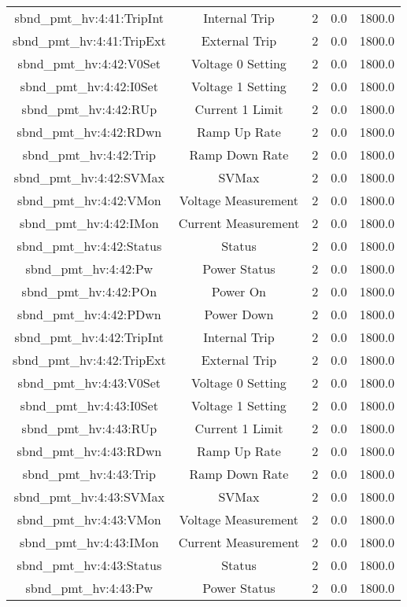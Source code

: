 \begin{center}
\begin{longtable}{c | c c c c }
sbnd\_pmt\_hv:4:41:TripInt & Internal Trip & 2 & 0.0 & 1800.0\\ 
sbnd\_pmt\_hv:4:41:TripExt & External Trip & 2 & 0.0 & 1800.0\\ 
sbnd\_pmt\_hv:4:42:V0Set & Voltage 0 Setting & 2 & 0.0 & 1800.0\\ 
sbnd\_pmt\_hv:4:42:I0Set & Voltage 1 Setting & 2 & 0.0 & 1800.0\\ 
sbnd\_pmt\_hv:4:42:RUp & Current 1 Limit & 2 & 0.0 & 1800.0\\ 
sbnd\_pmt\_hv:4:42:RDwn & Ramp Up Rate & 2 & 0.0 & 1800.0\\ 
sbnd\_pmt\_hv:4:42:Trip & Ramp Down Rate & 2 & 0.0 & 1800.0\\ 
sbnd\_pmt\_hv:4:42:SVMax & SVMax & 2 & 0.0 & 1800.0\\ 
sbnd\_pmt\_hv:4:42:VMon & Voltage Measurement & 2 & 0.0 & 1800.0\\ 
sbnd\_pmt\_hv:4:42:IMon & Current Measurement & 2 & 0.0 & 1800.0\\ 
sbnd\_pmt\_hv:4:42:Status & Status & 2 & 0.0 & 1800.0\\ 
sbnd\_pmt\_hv:4:42:Pw & Power Status & 2 & 0.0 & 1800.0\\ 
sbnd\_pmt\_hv:4:42:POn & Power On & 2 & 0.0 & 1800.0\\ 
sbnd\_pmt\_hv:4:42:PDwn & Power Down & 2 & 0.0 & 1800.0\\ 
sbnd\_pmt\_hv:4:42:TripInt & Internal Trip & 2 & 0.0 & 1800.0\\ 
sbnd\_pmt\_hv:4:42:TripExt & External Trip & 2 & 0.0 & 1800.0\\ 
sbnd\_pmt\_hv:4:43:V0Set & Voltage 0 Setting & 2 & 0.0 & 1800.0\\ 
sbnd\_pmt\_hv:4:43:I0Set & Voltage 1 Setting & 2 & 0.0 & 1800.0\\ 
sbnd\_pmt\_hv:4:43:RUp & Current 1 Limit & 2 & 0.0 & 1800.0\\ 
sbnd\_pmt\_hv:4:43:RDwn & Ramp Up Rate & 2 & 0.0 & 1800.0\\ 
sbnd\_pmt\_hv:4:43:Trip & Ramp Down Rate & 2 & 0.0 & 1800.0\\ 
sbnd\_pmt\_hv:4:43:SVMax & SVMax & 2 & 0.0 & 1800.0\\ 
sbnd\_pmt\_hv:4:43:VMon & Voltage Measurement & 2 & 0.0 & 1800.0\\ 
sbnd\_pmt\_hv:4:43:IMon & Current Measurement & 2 & 0.0 & 1800.0\\ 
sbnd\_pmt\_hv:4:43:Status & Status & 2 & 0.0 & 1800.0\\ 
sbnd\_pmt\_hv:4:43:Pw & Power Status & 2 & 0.0 & 1800.0\\ 

\end{longtable}
\end{center}
